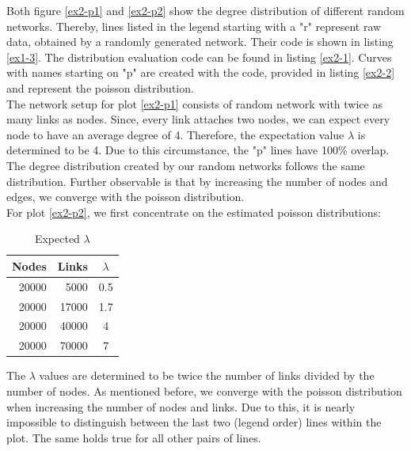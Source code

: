 \documentclass[10pt,a4paper]{article}
\begin{document}
\begin{enumerate}
Both figure \ref{ex2-p1} and \ref{ex2-p2} show the degree distribution of different random networks. Thereby, lines listed in the legend starting with a {"}r{"} represent raw data, obtained by a randomly generated network. Their code is shown in listing \ref{ex1-3}. The distribution evaluation code can be found in listing \ref{ex2-1}. Curves with names starting on {"}p{"} are created with the code, provided in listing \ref{ex2-2} and represent the poisson distribution.\\
The network setup for plot \ref{ex2-p1} consists of random network with twice as many links as nodes. Since, every link attaches two nodes, we can expect every node to have an average degree of 4. Therefore, the expectation value $\lambda$ is determined to be 4. Due to this circumstance, the {"}p{"} lines have 100{\%} overlap. The degree distribution created by our random networks follows the same distribution. Further observable is that by increasing the number of nodes and edges, we converge with the poisson distribution.\\
For plot \ref{ex2-p2}, we first concentrate on the estimated poisson distributions:\\
\begin{table}
	\caption{Expected $\lambda$}
	\label{ex2-lambda}
	\begin{tabular}{|r|r|c|}
	\hline 
	Nodes & Links & $\lambda$\\
	\hline \hline
	20000 & 5000 & 0.5\\
	\hline
	20000 & 17000 & 1.7\\
	\hline
	20000 & 40000 & 4\\
	\hline
	20000 & 70000 & 7\\
	\hline
	\end{tabular}
	\newline
The $\lambda$ values are determined to be twice the number of links divided by the number of nodes. As mentioned before, we converge with the poisson distribution when increasing the number of nodes and links. Due to this, it is nearly impossible to distinguish between the last two (legend order) lines within the plot. The same holds true for all other pairs of lines.
\end{table}
\end{enumerate}
\end{document}
